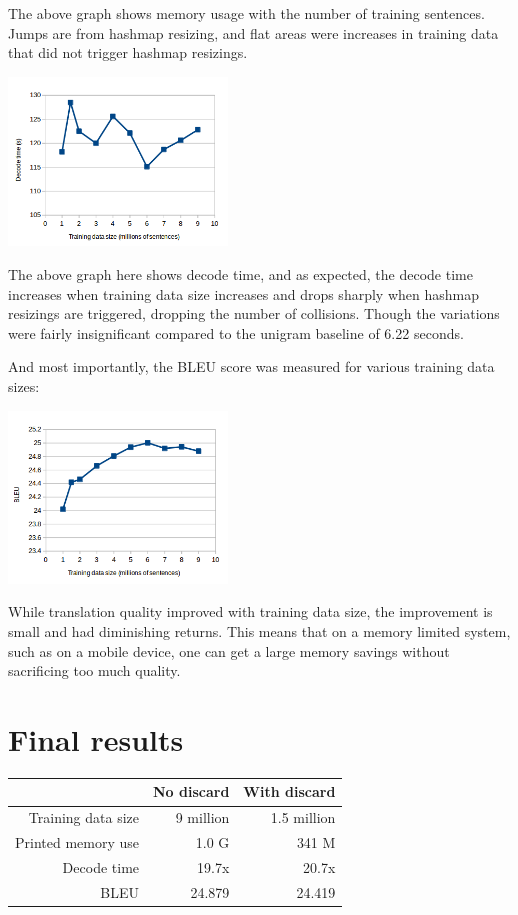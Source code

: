 \documentclass[11pt]{article}
\begin{document}
The above graph shows memory usage with the number of training sentences. Jumps are from hashmap resizing, and flat areas were increases in training data that did not trigger hashmap resizings.

\includegraphics[keepaspectratio=true, width=220px]{decode.png}

The above graph here shows decode time, and as expected, the decode time increases when training data size increases and drops sharply when hashmap resizings are triggered, dropping the number of collisions. Though the variations were fairly insignificant compared to the unigram baseline of 6.22 seconds.

And most importantly, the BLEU score was measured for various training data sizes:

\includegraphics[keepaspectratio=true, width=220px]{bleu.png}

While translation quality improved with training data size, the improvement is small and had diminishing returns. This means that on a memory limited system, such as on a mobile device, one can get a large memory savings without sacrificing too much quality.

\section{Final results}

\begin{tabular}{| r | r | r |}
\hline
 & No discard & With discard \\ \hline
Training data size & 9 million & 1.5 million \\ \hline
Printed memory use & 1.0 G & 341 M \\ \hline
Decode time & 19.7x & 20.7x \\ \hline
BLEU & 24.879 & 24.419 \\ \hline
\end{tabular}
\end{document}
